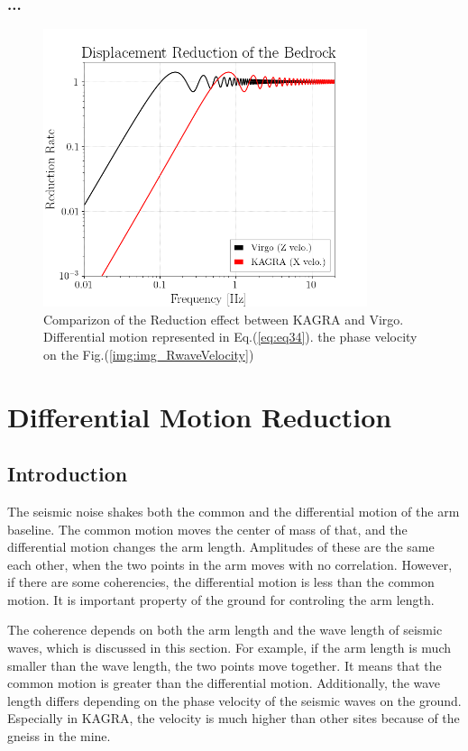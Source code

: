 \subsubsection{...}


\begin{figure}[H]
  \begin{center}
    \includegraphics[width=9.5cm]{../underground_seismic_noise/img_CDMR.png}
  \end{center}
  \caption{Comparizon of the Reduction effect between KAGRA and Virgo. Differential motion represented in Eq.(\ref{eq:eq34}).   the phase velocity on the Fig.(\ref{img:img_RwaveVelocity})}
  \label{img:img_dmrr}
\end{figure}


\section{Differential Motion Reduction}
\subsection{Introduction}
The seismic noise shakes both the common and the differential motion of the arm baseline. The common motion moves the center of mass of that, and the differential motion changes the arm length. Amplitudes of these are the same each other, when the two points in the arm moves with no correlation. However, if there are some coherencies, the differential motion is less than the common motion. It is important property of the ground for controling the arm length.

The coherence depends on both the arm length and the wave length of seismic waves, which is discussed in this section. For example, if the arm length is much smaller than the wave length, the two points move together. It means that the common motion is greater than the differential motion. Additionally, the wave length differs depending on the phase velocity of the seismic waves on the ground. Especially in KAGRA, the velocity is much higher than other sites because of the gneiss in the mine.


